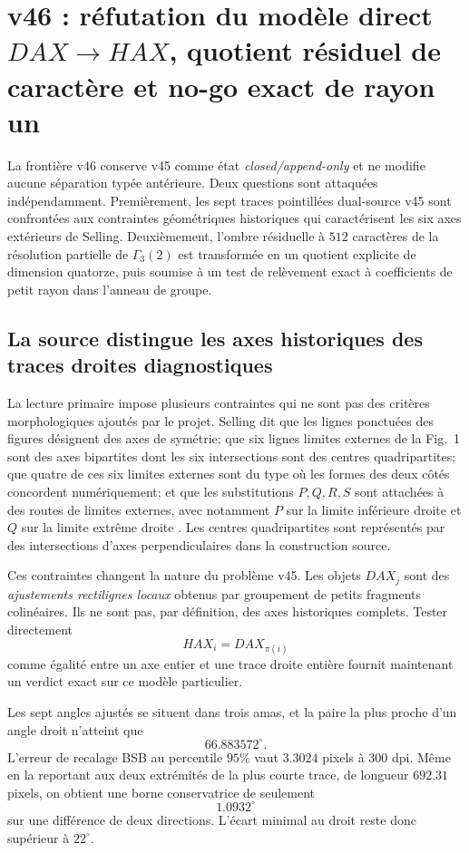 \documentclass[11pt,a4paper]{article}
\begin{document}
\section{v46 : réfutation du modèle direct $DAX\to HAX$, quotient résiduel de caractère et no-go exact de rayon un}
\label{sec:v46-axis-character-radius1}

La frontière v46 conserve v45 comme état \emph{closed/append-only} et ne modifie aucune séparation typée antérieure. Deux questions sont attaquées indépendamment. Premièrement, les sept traces pointillées dual-source v45 sont confrontées aux contraintes géométriques historiques qui caractérisent les six axes extérieurs de Selling. Deuxièmement, l'ombre résiduelle à $512$ caractères de la résolution partielle de $\Gamma_3(2)$ est transformée en un quotient explicite de dimension quatorze, puis soumise à un test de relèvement exact à coefficients de petit rayon dans l'anneau de groupe.

\subsection{La source distingue les axes historiques des traces droites diagnostiques}

La lecture primaire impose plusieurs contraintes qui ne sont pas des critères morphologiques ajoutés par le projet. Selling dit que les lignes ponctuées des figures désignent des axes de symétrie; que six lignes limites externes de la Fig.~1 sont des axes bipartites dont les six intersections sont des centres quadripartites; que quatre de ces six limites externes sont du type où les formes des deux côtés concordent numériquement; et que les substitutions $P,Q,R,S$ sont attachées à des routes de limites externes, avec notamment $P$ sur la limite inférieure droite et $Q$ sur la limite extrême droite \cite{Selling1877}. Les centres quadripartites sont représentés par des intersections d'axes perpendiculaires dans la construction source.

Ces contraintes changent la nature du problème v45. Les objets $DAX_j$ sont des \emph{ajustements rectilignes locaux} obtenus par groupement de petits fragments colinéaires. Ils ne sont pas, par définition, des axes historiques complets. Tester directement
\[
  HAX_i=DAX_{\pi(i)}
\]
comme égalité entre un axe entier et une trace droite entière fournit maintenant un verdict exact sur ce modèle particulier.

Les sept angles ajustés se situent dans trois amas, et la paire la plus proche d'un angle droit n'atteint que
\[
 \boxed{66.883572^\circ.}
\]
L'erreur de recalage BSB au percentile $95\%$ vaut $3.3024$ pixels à $300$ dpi. Même en la reportant aux deux extrémités de la plus courte trace, de longueur $692.31$ pixels, on obtient une borne conservatrice de seulement
\[
 \boxed{1.0932^\circ}
\]
sur une différence de deux directions. L'écart minimal au droit reste donc supérieur à $22^\circ$.
\end{document}
